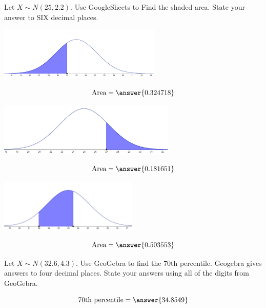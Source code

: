 \documentclass{ximera}
\begin{document}
\begin{problem}\label{prob:140hom5prob3}
Let $X\sim N(25, 2.2)$.  Use GoogleSheets to Find the shaded area.  State your answer to SIX decimal places.
\begin{image}
   \includegraphics[height=1in]{140H5pic1.jpg}
 \end{image}
 $$\mbox{Area}=\answer{0.324718}$$
 \begin{image}
   \includegraphics[height=1in]{140H5pic2.jpg}
 \end{image}
 $$\mbox{Area}=\answer{0.181651}$$
 \begin{image}
   \includegraphics[height=1in]{140H5pic3.jpg}
 \end{image}
 $$\mbox{Area}=\answer{0.503553}$$
\end{problem}

\begin{problem}\label{prob:140hom5prob4} Let $X\sim N(32.6, 4.3)$.  Use GeoGebra to find the 70th percentile.  Geogebra gives answers to four decimal places.  State your answers using all of the digits from GeoGebra.
\begin{center}  
\end{center}
$$70\mbox{th percentile}=\answer{34.8549}$$
\end{problem}
 
 
 
 
 
\end{document}
